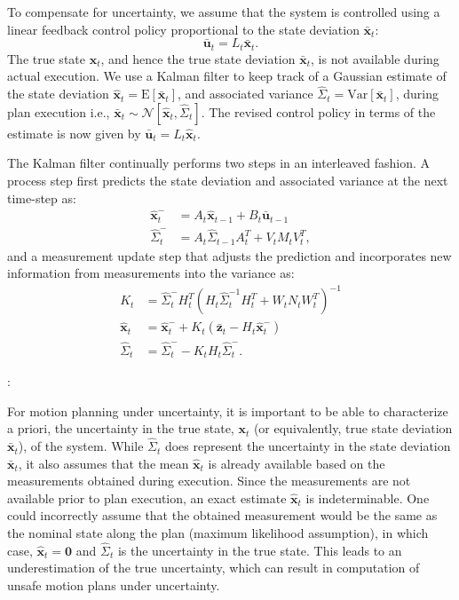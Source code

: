\documentclass[letterpaper]{article}
\begin{document}
To compensate for uncertainty, we assume that the system is controlled using a linear feedback control policy proportional to the state deviation $\bar{\mathbf{x}}_t$:
\begin{equation}
\bar{\mathbf{u}}_t = L_t\bar{\mathbf{x}}_{t}.
\label{eq:controlpolicy}
\end{equation}
The true state $\mathbf{x}_t$, and hence the true state deviation $\bar{\mathbf{x}}_t$, is not available during actual execution. We use a Kalman filter to keep track of a Gaussian estimate of the state deviation $\hat{\mathbf{x}}_t = \mathrm{E}[\bar{\mathbf{x}}_t]$, and associated variance $\hat{\Sigma}_t = \mathrm{Var}[\bar{\mathbf{x}}_t]$, during plan execution i.e., $\bar{\mathbf{x}}_t \sim \mathcal{N}[\hat{\mathbf{x}}_t, \hat{\Sigma}_t]$. The revised control policy in terms of the estimate is now given by $\bar{\mathbf{u}}_t = L_t\hat{\mathbf{x}}_{t}$.

The Kalman filter continually performs two steps in an interleaved fashion. A process step first predicts the state deviation and associated variance at the next time-step as:
\begin{align}
\hat{\mathbf{x}}^{-}_{t} &= A_t \hat{\mathbf{x}}_{t-1} + B_t \bar{\mathbf{u}}_{t-1} \label{eq:KalmanProcessA}\\
\hat{\Sigma}^{-}_{t} &= A_t \hat{\Sigma}_{t-1} A_t^T + V_t M_t V_t^T, \label{eq:KalmanProcessB}
\end{align}
and a measurement update step that adjusts the prediction and incorporates new information from measurements into the variance as:
\begin{align}
K_t &= \hat{\Sigma}^{-}_{t} H_t^T (H_t\hat{\Sigma}^{-1}_t H_t^T + W_t N_t W_t^T)^{-1} \label{eq:KalmanMeasurementA}\\
\hat{\mathbf{x}}_t &= \hat{\mathbf{x}}^{-}_{t} + K_t(\bar{\mathbf{z}}_t - H_t \hat{\mathbf{x}}^{-}_{t}) \label{eq:KalmanMeasurementB}\\
\hat{\Sigma}_t &= \hat{\Sigma}^{-}_{t} - K_t H_t \hat{\Sigma}^{-}_{t}. \label{eq:KalmanMeasurementC}
\end{align}

:

For motion planning under uncertainty, it is important to be able to characterize a priori, the uncertainty in the true state, $\mathbf{x}_t$ (or equivalently, true state deviation $\bar{\mathbf{x}}_t$), of the system. While $\hat{\Sigma}_t$ does represent the uncertainty in the state deviation $\bar{\mathbf{x}}_t$, it also assumes that the mean $\hat{\mathbf{x}}_t$ is already available based on the measurements obtained during execution. Since the measurements are not available prior to plan execution, an exact estimate $\hat{\mathbf{x}}_t$ is indeterminable. One could incorrectly assume that the obtained measurement would be the same as the nominal state along the plan (maximum likelihood assumption), in which case, $\hat{\mathbf{x}}_t = \mathbf{0}$ and $\hat{\Sigma}_t$ is the uncertainty in the true state. This leads to an underestimation of the true uncertainty, which can result in computation of unsafe motion plans under uncertainty.
\end{document}
